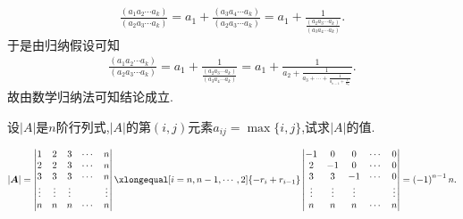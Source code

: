 \documentclass[lang=cn,newtx,10pt,scheme=chinese]{elegantbook}
\begin{document}
\begin{solution}
\begin{align*}
    \frac{\left( a_1a_2\cdots a_k \right)}{\left( a_2a_3\cdots a_k \right)}=a_1+\frac{\left( a_3a_4\cdots a_k \right)}{\left( a_2a_3\cdots a_k \right)}=a_1+\frac{1}{\frac{\left( a_2a_3\cdots a_k \right)}{\left( a_3a_4\cdots a_k \right)}}.
\end{align*}
于是由归纳假设可知
\begin{align*}
    \frac{\left( a_1a_2\cdots a_k \right)}{\left( a_2a_3\cdots a_k \right)}=a_1+\frac{1}{\frac{\left( a_2a_3\cdots a_k \right)}{\left( a_3a_4\cdots a_k \right)}}=a_1+\frac{1}{a_2+\frac{1}{a_3+\cdots +\frac{1}{a_{n-1}+\frac{1}{a_n}}}}.
\end{align*}
故由数学归纳法可知结论成立.
\end{solution}

\begin{exercise}
    设\(\vert A\vert\)是\(n\)阶行列式,\(\vert A\vert\)的第\((i,j)\)元素\(a_{ij}=\max\{i,j\}\),试求\(\vert A\vert\)的值.
\end{exercise}
\begin{solution}
    \begin{align*}
        \left| \boldsymbol{A} \right|=\left| \begin{matrix}
            1&		2&		3&		\cdots&		n\\
            2&		2&		3&		\cdots&		n\\
            3&		3&		3&		\cdots&		n\\
            \vdots&		\vdots&		\vdots&		&		\vdots\\
            n&		n&		n&		\cdots&		n\\
        \end{matrix} \right|\xlongequal[i=n,n-1,\cdots ,2]{-r_i+r_{i-1}}\left| \begin{matrix}
            -1&		0&		0&		\cdots&		0\\
            2&		-1&		0&		\cdots&		0\\
            3&		3&		-1&		\cdots&		0\\
            \vdots&		\vdots&		\vdots&		&		\vdots\\
            n&		n&		n&		\cdots&		n\\
        \end{matrix} \right|=\left( -1 \right) ^{n-1}n.
    \end{align*}
\end{solution}
\end{document}
